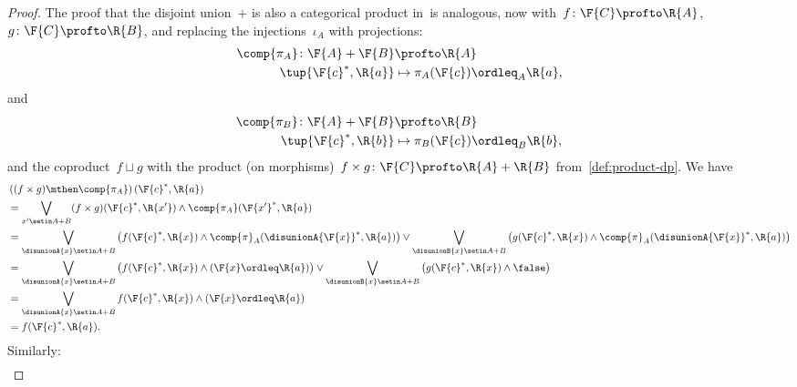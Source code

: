 \begin{proof}
    The proof that the disjoint union~$+$ is also a categorical product in~\DP is analogous, now with~$f \colon \F{C} \profto \R{A}$,~$g \colon \F{C} \profto \R{B}$, and replacing the injections~$\iota_A$ with projections:
    \begin{equation}
        \begin{aligned}
            \comp{\pi_A} \colon \F{A}+\F{B} & \profto \R{A} \\
            \tup{\F{c}^*,\R{a}}             & \mapsto \pi_A(\F{c})\ordleq_A \R{a},
        \end{aligned}
    \end{equation}
    and
    \begin{equation}
        \begin{aligned}
            \comp{\pi_B} \colon \F{A}+\F{B} & \profto \R{B} \\
            \tup{\F{c}^*,\R{b}}             & \mapsto \pi_B(\F{c})\ordleq_B \R{b},
        \end{aligned}
    \end{equation}
    and the coproduct~$f \sqcup g$ with the product (on morphisms)~$f \times g \colon \F{C} \profto \R{A} + \R{B}$ from~\cref{def:product-dp}.
    We have
    \begin{equation}
        \begin{aligned}
             & \left((f\times g)\mthen \comp{\pi_A}\right)(\F{c}^*,\R{a}) \\
             & =\bigvee_{x'\setin A+B} (f\times g)(\F{c}^*,\R{x'}) \wedge \comp{\pi_A}(\F{x'}^*,\R{a}) \\
             & =\bigvee_{\disunionA{x}\setin A+B}\left( f(\F{c}^*,\R{x}) \wedge \comp{\pi}_A(\disunionA{\F{x}}^*,\R{a})\right) \vee
            \bigvee_{\disunionB{x}\setin A+B}\left( g(\F{c}^*,\R{x}) \wedge \comp{\pi}_A(\disunionA{\F{x}}^*,\R{a})\right) \\
             & =\bigvee_{\disunionA{x}\setin A+B}\left( f(\F{c}^*,\R{x}) \wedge (\F{x}\ordleq \R{a})\right) \vee
            \bigvee_{\disunionB{x}\setin A+B}\left( g(\F{c}^*,\R{x}) \wedge \false \right) \\
             & =\bigvee_{\disunionA{x}\setin A+B} f(\F{c}^*,\R{x}) \wedge (\F{x}\ordleq \R{a}) \\
             & =f(\F{c}^*,\R{a}).
        \end{aligned}
    \end{equation}
    Similarly:
    \begin{equation}
        \begin{aligned}

\end{aligned}
\end{equation}
\end{proof}
